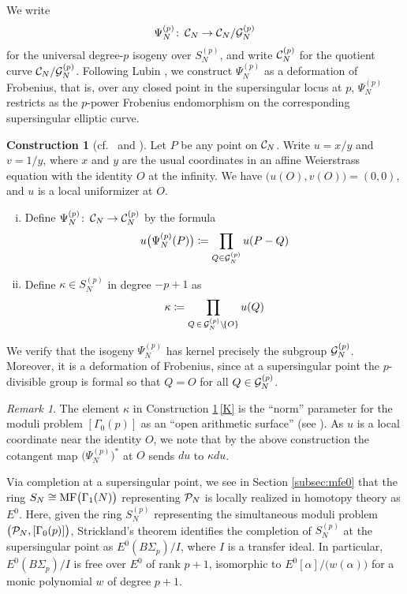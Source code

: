 \documentclass{gtpart}
\theoremstyle{definition}
\newtheorem{cstr}[equation]{Construction}
\theoremstyle{remark}
\newtheorem{rmk}[equation]{Remark}
\def\co{\colon\thinspace}
\newcommand{\CC}{{\cal C}}
\newcommand{\CG}{{\cal G}}
\newcommand{\CP}{{\cal P}}
\newcommand{\MF}{{\rm MF}}
\newcommand{\A}{\alpha}
\newcommand{\G}{\Gamma}
\newcommand{\K}{\kappa}
\newcommand{\ce}{\coloneqq}
\renewcommand{\=}{\approx}
\renewcommand{\-}{\sim}
\numberwithin{equation}{section}
\begin{document}
We write 
\[
 \Psi_N^{(p)} \co \CC_N \to \CC_N / \CG_N^{(p)} 
\]
for the universal degree-$p$ isogeny over $S_N^{(p)}$, and write $\CC_N^{(p)}$ 
for the quotient curve $\CC_N / \CG_N^{(p)}$.  Following Lubin 
\cite[proof of Theorem 1.4]{Lubin67}, we construct $\Psi_N^{(p)}$ as a 
deformation of Frobenius, that is, over any closed point in the supersingular 
locus at $p$, $\Psi_N^{(p)}$ restricts as the $p$-power Frobenius endomorphism 
on the corresponding supersingular elliptic curve.  

\begin{cstr}[{cf.~\cite[proof of Theorem 1.4]{Lubin67} and 
\cite[Section 7.7]{KM}}]
 \label{cstr}
 Let $P$ be any point on $\CC_N$.  Write $u = x / y$ and $v = 1 / y$, where $x$ 
 and $y$ are the usual coordinates in an affine Weierstrass equation with the 
 identity $O$ at the infinity.  We have $\big( u(O), v(O) \big) = (0,0)$, and 
 $u$ is a local uniformizer at $O$.  
 \begin{enumerate}[(i)]
  \item  Define $\Psi_N^{(p)} \co \CC_N \to \CC_N^{(p)}$ by the formula 
  \[
   u\big(\Psi_N^{(p)}(P)\big) \ce \prod_{Q \in \CG_N^{(p)}} u(P - Q) 
  \]

  \item \label{K}  Define $\K \in S_N^{(p)}$ in degree $-p + 1$ as 
  \[
   \K \ce \prod_{Q \, \in \, \CG_N^{(p)} \setminus \! \{O\}} u(Q) 
  \]
 \end{enumerate}
\end{cstr}

We verify that the isogeny $\Psi_N^{(p)}$ has kernel precisely the subgroup 
$\CG_N^{(p)}$.  Moreover, it is a deformation of Frobenius, since at a 
supersingular point the $p$-divisible group is formal so that $Q = O$ for all 
$Q \in \CG_N^{(p)}$.  

\begin{rmk}
 \label{rmk:K}
 The element $\K$ in Construction \ref{cstr}\,\eqref{K} is the ``norm'' 
 parameter for the moduli problem $[\G_0(p)]$ as an ``open arithmetic surface'' 
 (see \cite[Section 7.7]{KM}).  As $u$ is a local coordinate near the identity 
 $O$, we note that by the above construction the cotangent map 
 $\big(\Psi_N^{(p)}\big)^*$ at $O$ sends $du$ to $\K du$.  
\end{rmk}

Via completion at a supersingular point, we see in Section \ref{subsec:mfe0} 
that the ring $S_N \cong \MF\big(\G_1(N)\big)$ representing $\CP_N$ is locally 
realized in homotopy theory as $E^0$.  Here, given the ring $S_N^{(p)}$ 
representing the simultaneous moduli problem $\big(\CP_N,[\G_0(p)]\big)$, 
Strickland's theorem \cite[Theorem 1.1]{Str98} identifies the completion of 
$S_N^{(p)}$ at the supersingular point as $E^0(B\Sigma_p) / I$, where $I$ is a 
transfer ideal.  In particular, $E^0(B\Sigma_p) / I$ is free over $E^0$ of rank 
$p + 1$, isomorphic to $E^0[\A] / \big( w(\A) \big)$ for a monic polynomial $w$ 
of degree $p + 1$.  
\end{document}
